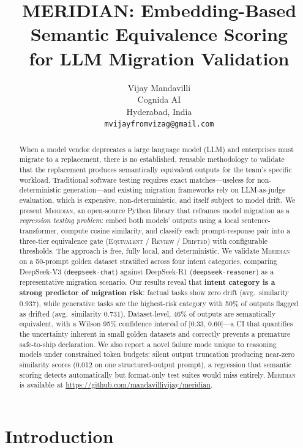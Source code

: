 \documentclass[11pt,a4paper]{article}
\title{\textbf{MERIDIAN}: Embedding-Based Semantic Equivalence Scoring\\
       for LLM Migration Validation}
\author{
  Vijay Mandavilli \\
  Cognida AI \\
  Hyderabad, India \\
  \texttt{mvijayfromvizag@gmail.com}
}
\date{}
\begin{document}
\maketitle

\begin{abstract}
When a model vendor deprecates a large language model (LLM) and enterprises must migrate
to a replacement, there is no established, reusable methodology to validate that the
replacement produces semantically equivalent outputs for the team's specific workload.
Traditional software testing requires exact matches---useless for non-deterministic
generation---and existing migration frameworks rely on LLM-as-judge evaluation, which
is expensive, non-deterministic, and itself subject to model drift.
We present \textsc{Meridian}, an open-source Python library that reframes model migration
as a \emph{regression testing problem}: embed both models' outputs using a local
sentence-transformer, compute cosine similarity, and classify each prompt-response pair
into a three-tier equivalence gate (\textsc{Equivalent} / \textsc{Review} / \textsc{Drifted})
with configurable thresholds.
The approach is free, fully local, and deterministic.
We validate \textsc{Meridian} on a 50-prompt golden dataset stratified across four intent
categories, comparing DeepSeek-V3 (\texttt{deepseek-chat}) against DeepSeek-R1
(\texttt{deepseek-reasoner}) as a representative migration scenario.
Our results reveal that \textbf{intent category is a strong predictor of migration risk}:
factual tasks show zero drift (avg.\ similarity 0.937), while generative tasks are
the highest-risk category with 50\% of outputs flagged as drifted (avg.\ similarity
0.731).
Dataset-level, 46\% of outputs are semantically equivalent, with a Wilson 95\%
confidence interval of [0.33, 0.60]---a CI that quantifies the uncertainty inherent
in small golden datasets and correctly prevents a premature safe-to-ship declaration.
We also report a novel failure mode unique to reasoning models under constrained token
budgets: silent output truncation producing near-zero similarity scores
(0.012 on one structured-output prompt), a regression that semantic scoring detects
automatically but format-only test suites would miss entirely.
\textsc{Meridian} is available at \url{https://github.com/mandavillivijay/meridian}.
\end{abstract}

\section{Introduction}
\end{document}
